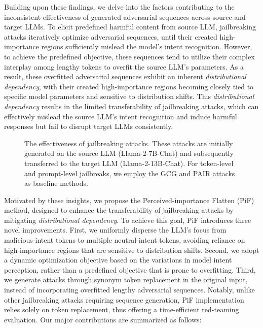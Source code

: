 Building upon these findings, we delve into the factors contributing to the inconsistent effectiveness of generated adversarial sequences across source and target LLMs.
To elicit predefined harmful content from source LLM, jailbreaking attacks iteratively optimize adversarial sequences, until their created high-importance regions sufficiently mislead the model's intent recognition.
However, to achieve the predefined objective, these sequences tend to utilize their complex interplay among lengthy tokens to overfit the source LLM's parameters.
As a result, these overfitted adversarial sequences exhibit an inherent \emph{distributional dependency}, with their created high-importance regions becoming closely tied to specific model parameters and sensitive to distribution shifts. 
This \emph{distributional dependency} results in the limited transferability of jailbreaking attacks, which can effectively mislead the source LLM's intent recognition and induce harmful responses but fail to disrupt target LLMs consistently.

\begin{figure*}[t]
    \centering
        \begin{subfigure}
        {
            \texttt{[image: image/Observation.pdf]}
        }
        \end{subfigure}
    \vspace{-0.55em}
    \caption{The effectiveness of jailbreaking attacks. These attacks are initially generated on the source LLM (Llama-2-7B-Chat) and subsequently transferred to the target LLM (Llama-2-13B-Chat). For token-level and prompt-level jailbreaks, we employ the GCG and PAIR attacks as baseline methods.}
    \vspace{-1.2em}
    \label{fig:1}
\end{figure*}

Motivated by these insights, we propose the Perceived-importance Flatten (PiF) method, designed to enhance the transferability of jailbreaking attacks by mitigating \emph{distributional dependency}.
To achieve this goal, PiF introduces three novel improvements.
First, we uniformly disperse the LLM's focus from malicious-intent tokens to multiple neutral-intent tokens, avoiding reliance on high-importance regions that are sensitive to distribution shifts.
Second, we adopt a dynamic optimization objective based on the variations in model intent perception, rather than a predefined objective that is prone to overfitting.
Third, we generate attacks through synonym token replacement in the original input, instead of incorporating overfitted lengthy adversarial sequences.
Notably, unlike other jailbreaking attacks requiring sequence generation, PiF implementation relies solely on token replacement, thus offering a time-efficient red-teaming evaluation.
Our major contributions are summarized as follows:

